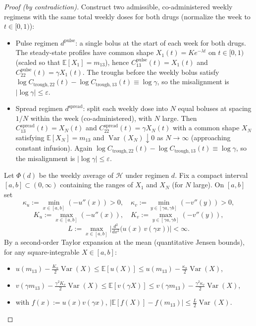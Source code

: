 \begin{proof}[Proof (by contradiction)]
Construct two admissible, co-administered weekly regimens with the same total weekly doses for both drugs (normalize the week to $t\in[0,1)$):
\begin{itemize}
  \item Pulse regimen $d^{\mathrm{pulse}}$: a single bolus at the start of each week for both drugs. The steady-state profiles have common shape $X_{1}(t)=K e^{-\lambda t}$ on $t\in[0,1)$ (scaled so that $\mathbb E[X_1]=m_{13}$), hence $C_{13}^{\mathrm{pulse}}(t)=X_1(t)$ and $C_{22}^{\mathrm{pulse}}(t)=\gamma X_1(t)$. The troughs before the weekly bolus satisfy $\log C_{\mathrm{trough},22}(t)-\log C_{\mathrm{trough},13}(t)\equiv\log\gamma$, so the misalignment is $|\log\gamma|\le\varepsilon$.
  \item Spread regimen $d^{\mathrm{spread}}$: split each weekly dose into $N$ equal boluses at spacing $1/N$ within the week (co-administered), with $N$ large. Then $C_{13}^{\mathrm{spread}}(t)=X_N(t)$ and $C_{22}^{\mathrm{spread}}(t)=\gamma X_N(t)$ with a common shape $X_N$ satisfying $\mathbb E[X_N]=m_{13}$ and $\operatorname{Var}(X_N)\downarrow0$ as $N\to\infty$ (approaching constant infusion). Again $\log C_{\mathrm{trough},22}(t)-\log C_{\mathrm{trough},13}(t)\equiv\log\gamma$, so the misalignment is $|\log\gamma|\le\varepsilon$.
\end{itemize}

Let $\Phi(d)$ be the weekly average of $\mathcal H$ under regimen $d$. Fix a compact interval $[a,b]\subset(0,\infty)$ containing the ranges of $X_1$ and $X_N$ (for $N$ large). On $[a,b]$ set
$$\kappa_u:=\min_{x\in[a,b]}(-u''(x))>0,\quad \kappa_v:=\min_{y\in[\gamma a,\gamma b]}(-v''(y))>0,$$
$$K_u:=\max_{x\in[a,b]}(-u''(x)),\quad K_v:=\max_{y\in[\gamma a,\gamma b]}(-v''(y)),$$
$$L:=\max_{x\in[a,b]}\Big|\tfrac{d^2}{dx^2}\big(u(x)\,v(\gamma x)\big)\Big|<\infty.$$
By a second-order Taylor expansion at the mean (quantitative Jensen bounds), for any square-integrable $X\in[a,b]$:
\begin{itemize}
  \item $u(m_{13})-\tfrac{K_u}{2}\operatorname{Var}(X)\le\mathbb E[u(X)]\le u(m_{13})-\tfrac{\kappa_u}{2}\operatorname{Var}(X)$,
  \item $v(\gamma m_{13})-\tfrac{\gamma^2 K_v}{2}\operatorname{Var}(X)\le\mathbb E[v(\gamma X)]\le v(\gamma m_{13})-\tfrac{\gamma^2\kappa_v}{2}\operatorname{Var}(X)$,
  \item with $f(x):=u(x)v(\gamma x)$, $\big|\mathbb E[f(X)]-f(m_{13})\big|\le\tfrac{L}{2}\operatorname{Var}(X)$.
\end{itemize}


\end{proof}
